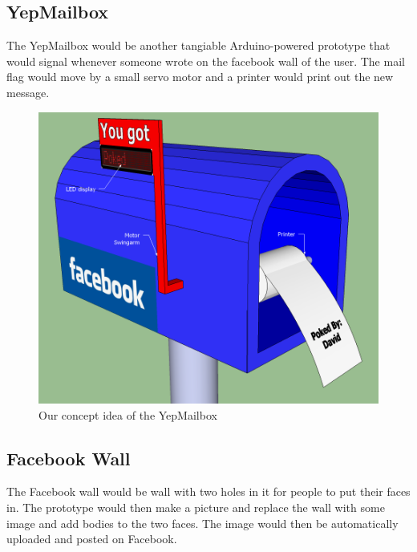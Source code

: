 \subsection{YepMailbox}
The YepMailbox would be another tangiable Arduino-powered prototype that would signal whenever someone wrote
on the facebook wall of the user. The mail flag would move by a small servo motor and a printer would print out the
new message.

\begin{figure}[h!]
\centering \includegraphics[scale=0.4]{img/prestudies-YepMailbox} \caption{Our concept idea of the YepMailbox}

\label{fig:prestudies-YepMailbox}
\end{figure}

\subsection{Facebook Wall}
The Facebook wall would be wall with two holes in it for people to put their faces in. The prototype would then make a
picture and replace the wall with some image and add bodies to the two faces. The image would then be automatically
uploaded and posted on Facebook.

